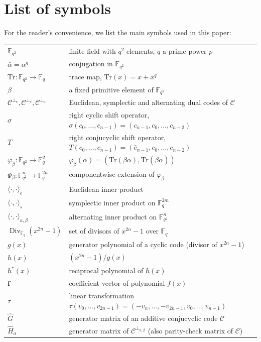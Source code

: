 \documentclass{aims}
\numberwithin{equation}{section}
\theoremstyle{definition}
\newcommand{\F}{\mathbb{F}}
\newcommand{\Tr}{\mathrm{Tr}}
\newcommand{\Div}{\operatorname{Div}}
\begin{document}
	\section*{List of symbols}
For the reader's convenience, we list the main symbols used in this paper:
	\begin{center}
		\begin{tabular}{l l}
			$\mathbb{F}_{q^2}$ & finite field with $q^2$ elements, $q$ a prime power $p$ \\
			$\bar{\alpha} = \alpha^q$ & conjugation in $\mathbb{F}_{q^2}$ \\
			$\Tr: \mathbb{F}_{q^2} \to \mathbb{F}_q$ & trace map, $\Tr(x)=x+x^q$ \\
			$\beta$ & a fixed primitive element of $\mathbb{F}_{q^2}$ \\
			$\mathcal{C}^{\perp_e},\mathcal{C}^{\perp_s},\mathcal{C}^{\perp_a}$ & Euclidean, symplectic and alternating dual codes of $\mathcal{C}$ \\
		$\sigma$ & right cyclic shift operator, $\sigma(c_0,\dots,c_{n-1}) = (c_{n-1},c_0,\dots,c_{n-2})$ \\
			$T$ & right conjucyclic shift operator, $T(c_0,\dots,c_{n-1})=(\bar{c}_{n-1},c_0,\dots,c_{n-2})$ \\
			$\varphi_\beta: \mathbb{F}_{q^2}\to\mathbb{F}_q^2$ & $\varphi_\beta(\alpha)=(\Tr(\beta\alpha),\Tr(\bar{\beta}\alpha))$ \\
			$\Psi_\beta: \mathbb{F}_{q^2}^n\to\mathbb{F}_q^{2n}$ & componentwise extension of $\varphi_\beta$ \\
			$\langle\cdot,\cdot\rangle_e$ & Euclidean inner product \\
			$\langle\cdot,\cdot\rangle_s$ & symplectic inner product on $\mathbb{F}_q^{2m}$ \\
			$\langle\cdot,\cdot\rangle_{a,\beta}$ & alternating inner product on $\mathbb{F}_{q^2}^n$ \\
			$\Div_{\F_q}(x^{2n} - 1)$& set of divisors of $x^{2n}-1$ over $\F_q$\\
			$g(x)$ & generator polynomial of a cyclic code (divisor of $x^{2n}-1$) \\
			$h(x)$ & $(x^{2n}-1)/g(x)$\\
			$h^*(x)$ & reciprocal polynomial of $h(x)$ \\
			$\pmb{f}$ & coefficient vector of polynomial $f(x)$ \\
			$\tau$ & linear transformation $\tau(v_0,\dots,v_{2n-1})=(-v_n,\dots,-v_{2n-1},v_0,\dots,v_{n-1})$ \\
			$\hat{G}$ & generator matrix of an additive conjucyclic code $\mathcal{C}$ \\
			$\hat{H}_a$ & generator matrix of $\mathcal{C}^{\perp_{a,\beta}}$ (also parity-check matrix of $\mathcal{C}$) \\
		\end{tabular}
	\end{center}
	
\end{document}
